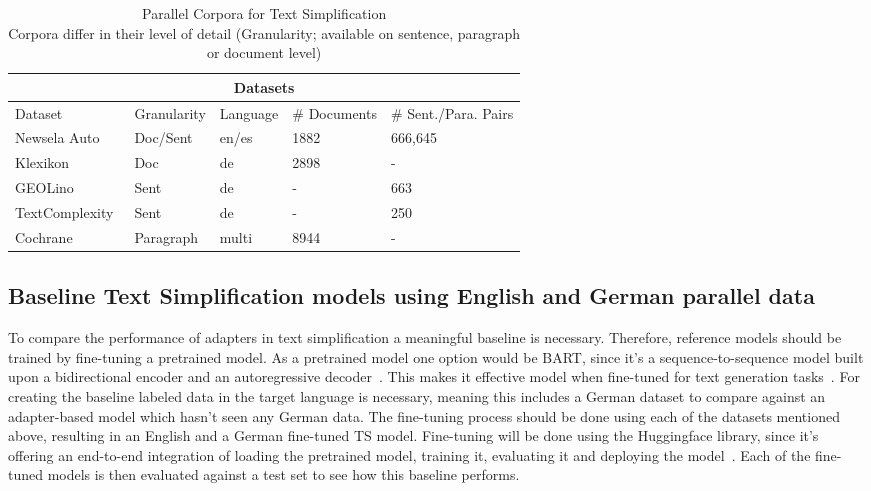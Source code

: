 \begin{table}[h!]
    \centering
    \begin{tabular}{ |p{3cm}|p{2.5cm}|p{2.5cm}|p{2.5cm}|p{2.5cm}| }
        \hline
        \multicolumn{5}{|c|}{Datasets} \\
        \hline
        Dataset & Granularity & Language & \# Documents & \# Sent./Para. Pairs \\
        \hline
        Newsela Auto~\cite{Xu2015} & Doc/Sent & en/es & 1882 & 666,645 \\
        Klexikon~\cite{Aumiller2022} & Doc & de & 2898 & - \\
        GEOLino~\cite{Mallinson2020} & Sent & de & - & 663 \\
        TextComplexity~\cite{Mallinson2020} & Sent & de & - & 250 \\
        Cochrane~\cite{Devaraj2021} & Paragraph & multi & 8944 & - \\
        \hline
    \end{tabular}
    \caption{Parallel Corpora for Text Simplification\\
        Corpora differ in their level of detail (Granularity; available on sentence, paragraph or document level)
    }
    \label{table:datasets}
\end{table}


\subsection{Baseline Text Simplification models using English and German parallel data}
To compare the performance of adapters in text simplification a meaningful baseline is necessary.
Therefore, reference models should be trained by fine-tuning a pretrained model.
As a pretrained model one option would be BART, since it's a sequence-to-sequence model
built upon a bidirectional encoder and an autoregressive decoder~\cite{Lewis2019}.
This makes it effective model when fine-tuned for text generation tasks~\cite{Lewis2019}.
For creating the baseline labeled data in the target language is necessary, meaning this includes a German dataset to compare against
an adapter-based model which hasn't seen any German data.
The fine-tuning process should be done using each of the datasets mentioned above,
resulting in an English and a German fine-tuned TS model.
Fine-tuning will be done using the Huggingface library, since it's offering an end-to-end
integration of loading the pretrained model, training it, evaluating it and deploying the model~\cite{Huggingface2023}.
Each of the fine-tuned models is then evaluated against a test set to see how this
baseline performs.

